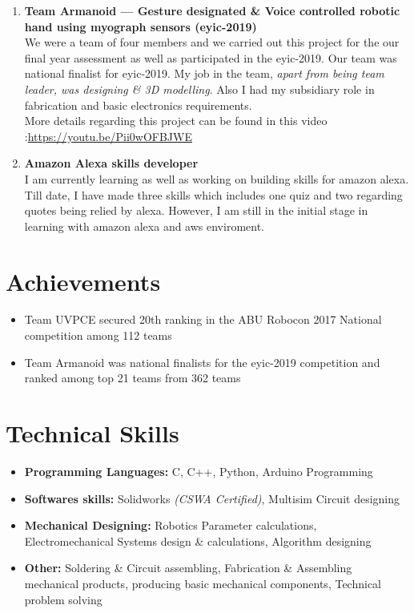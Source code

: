 \documentclass[margin,line]{res}
\begin{document}
\begin{resume}
\begin{enumerate}
\item{\bf Team Armanoid --- Gesture designated \& Voice controlled robotic hand using myograph sensors (eyic-2019)}\\
We were a team of four members and we carried out this project for the our final year assessment as well as participated in the eyic-2019. Our team was national finalist for eyic-2019. My job in the team, {\em apart from being team leader, was designing \& 3D modelling}. Also I had my subsidiary role in fabrication and basic electronics requirements.\\
More details regarding this project can be found in this video :\url{https://youtu.be/Pii0wOFBJWE}

\item {\bf Amazon Alexa skills developer}\\
I am currently learning as well as working on building skills for amazon alexa.\\
Till date, I have made three skills which includes one quiz and two regarding quotes being relied by alexa. However, I am still in the initial stage in learning with amazon alexa and aws enviroment.
\end{enumerate}



\section{\sc\bf Achievements}
\begin{itemize}

\item Team UVPCE secured 20th ranking in the ABU Robocon 2017 National competition among 112 teams

\item Team Armanoid was national finalists for the eyic-2019 competition and ranked among top 21 teams from 362 teams
\end{itemize}


\section{\sc \bf Technical Skills}
\begin{itemize}

\item {\bf Programming Languages:} C, C++, Python, Arduino Programming
\item {\bf Softwares skills:} Solidworks {\em (CSWA Certified)}, Multisim Circuit designing
\item {\bf Mechanical Designing:} Robotics Parameter calculations, Electromechanical Systems design \& calculations, Algorithm designing
\item {\bf Other:} Soldering \& Circuit assembling, Fabrication \& Assembling mechanical products, producing basic mechanical components, Technical problem solving 
\end{itemize}


\end{resume}
\end{document}
